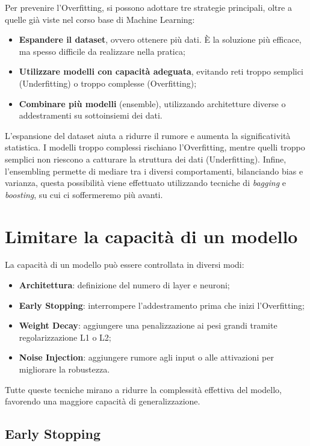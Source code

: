 Per prevenire l’Overfitting, si possono adottare tre strategie principali, oltre a quelle già viste nel corso base di Machine Learning:

\begin{itemize}
\item \textbf{Espandere il dataset}, ovvero ottenere più dati. È la soluzione più efficace, ma spesso difficile da realizzare nella pratica;
\item \textbf{Utilizzare modelli con capacità adeguata}, evitando reti troppo semplici (Underfitting) o troppo complesse (Overfitting);
\item \textbf{Combinare più modelli} (ensemble), utilizzando architetture diverse o addestramenti su sottoinsiemi dei dati.
\end{itemize}

L’espansione del dataset aiuta a ridurre il rumore e aumenta la significatività statistica. I modelli troppo complessi rischiano l’Overfitting, mentre quelli troppo semplici non riescono a catturare la struttura dei dati (Underfitting). Infine, l’ensembling permette di mediare tra i diversi comportamenti, bilanciando bias e varianza, questa possibilità viene effettuato utilizzando tecniche di \textit{bagging} e \textit{boosting}, su cui ci soffermeremo più avanti.

\section{Limitare la capacità di un modello}

La capacità di un modello può essere controllata in diversi modi:

\begin{itemize}
\item \textbf{Architettura}: definizione del numero di layer e neuroni;
\item \textbf{Early Stopping}: interrompere l’addestramento prima che inizi l’Overfitting;
\item \textbf{Weight Decay}: aggiungere una penalizzazione ai pesi grandi tramite regolarizzazione L1 o L2;
\item \textbf{Noise Injection}: aggiungere rumore agli input o alle attivazioni per migliorare la robustezza.
\end{itemize}

Tutte queste tecniche mirano a ridurre la complessità effettiva del modello, favorendo una maggiore capacità di generalizzazione.

\subsection{Early Stopping}

